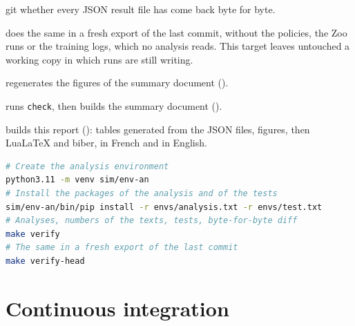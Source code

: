 \begin{description}[style=nextline,leftmargin=1.5em]
        git whether every JSON result file has come back byte for byte.
  \item[\texttt{make verify-head}] does the same in a fresh export of the last commit, without the
        policies, the Zoo runs or the training logs, which no analysis reads. This target leaves
        untouched a working copy in which runs are still writing.
  \item[\texttt{make figures}] regenerates the figures of the summary document
        ().
  \item[\texttt{make docs}] runs \texttt{check}, then builds the summary document
        ().
  \item[\texttt{make report}] builds this report (): tables generated from
        the JSON files, figures, then LuaLaTeX and biber, in French and in English.
\end{description}

\begin{lstlisting}[language=bash,caption={Recomputing every number from the committed results, without training.},captionpos=b]
# Create the analysis environment
python3.11 -m venv sim/env-an
# Install the packages of the analysis and of the tests
sim/env-an/bin/pip install -r envs/analysis.txt -r envs/test.txt
# Analyses, numbers of the texts, tests, byte-for-byte diff
make verify
# The same in a fresh export of the last commit
make verify-head
\end{lstlisting}

\section{Continuous integration}
\label{sec:ci}

